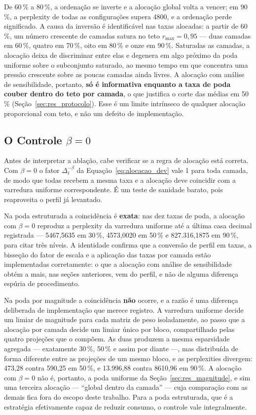 De 60\,\% a 80\,\%, a ordenação se inverte e a alocação global volta a vencer; em
90\,\%, a perplexity de todas as configurações supera 4800, e a ordenação perde
significado. A causa da inversão é identificável nas taxas alocadas: a partir de 60\,\%,
um número crescente de camadas satura no teto $r_{\max} = 0{,}95$ --- duas camadas em
60\,\%, quatro em 70\,\%, oito em 80\,\% e onze em 90\,\%. Saturadas as
camadas, a alocação deixa de discriminar entre elas e degenera em algo próximo
da poda uniforme sobre o subconjunto saturado, ao mesmo tempo em que concentra
uma pressão crescente sobre as poucas camadas ainda livres. A alocação com análise de
sensibilidade, portanto, \textbf{só é informativa enquanto a taxa de poda couber dentro
do teto por camada}, o que justifica o corte das médias em 50\,\%
(Seção~\ref{sec:res_protocolo}). Esse é um limite intrínseco de qualquer alocação
proporcional com teto, e não um defeito de implementação.

\subsection{O Controle $\beta = 0$}\label{subsec:controle_beta_zero}

Antes de interpretar a ablação, cabe verificar se a regra de alocação está
correta. Com $\beta = 0$ o fator $\Delta_{\ell}^{-\beta}$ da
Equação~\ref{eq:alocacao_dev} vale 1 para toda camada, de modo que todas recebem
a mesma taxa e a alocação deve coincidir com a varredura uniforme
correspondente. É um teste de sanidade barato, pois reaproveita o perfil já
levantado.

Na poda estruturada a coincidência é \textbf{exata}: nas dez taxas de
poda, a alocação com $\beta = 0$ reproduz a perplexity da varredura
uniforme até a última casa decimal registrada --- 5467,5635 em 30\,\%,
4573,0020 em 50\,\% e 827.316,1875 em 90\,\%, para citar três níveis. A
identidade confirma que a conversão de perfil em taxas, a bisseção do fator de
escala e a aplicação das taxas por camada estão implementadas corretamente: o
que a alocação com análise de sensibilidade obtém a mais, nas seções anteriores, vem do
perfil, e não de alguma diferença espúria de procedimento.

Na poda por magnitude a coincidência \textbf{não} ocorre, e a razão é uma
diferença deliberada de implementação que merece registro. A varredura uniforme
decide um limiar de magnitude para cada matriz de peso isoladamente, ao passo
que a alocação por camada decide um limiar único por bloco, compartilhado pelas
quatro projeções que o compõem. As duas produzem a mesma esparsidade agregada
--- exatamente 30\,\%, 50\,\% e assim por diante ---, mas distribuída de
forma diferente entre as projeções de um mesmo bloco, e as perplexities
divergem: 473,28 contra 590,25 em 50\,\%, e 13.996,88 contra 8610,96 em
90\,\%. A alocação com $\beta = 0$ não é, portanto, a poda
uniforme da Seção~\ref{sec:res_magnitude}, e sim uma terceira alocação
--- ``global dentro da camada'' --- cuja comparação com as demais fica fora do
escopo deste trabalho. Para a poda estruturada, que é a estratégia
efetivamente capaz de reduzir consumo, o controle vale integralmente.

